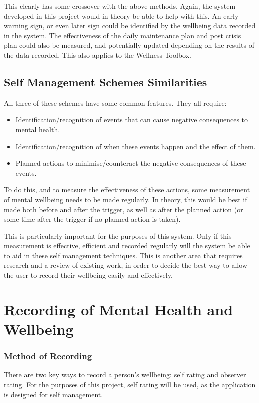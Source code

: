 \documentclass[11pt,openright,a4paper]{report}
\begin{document}
This clearly has some crossover with the above methods. Again, the system developed in this project would in theory be able to help with this. An early warning sign, or even later sign could be identified by the wellbeing data recorded in the system. The effectiveness of the daily maintenance plan and post crisis plan could also be measured, and potentially updated depending on the results of the data recorded. This also applies to the Wellness Toolbox.

\subsection{Self Management Schemes Similarities}
All three of these schemes have some common features. They all require:
\begin{itemize}
\item Identification/recognition of events that can cause negative consequences to mental health.
\item Identification/recognition of when these events happen and the effect of them.
\item Planned actions to minimise/counteract the negative consequences of these events.
\end{itemize}

To do this, and to measure the effectiveness of these actions, some measurement of mental wellbeing needs to be made regularly. In theory, this would be best if made both before and after the trigger, as well as after the planned action (or some time after the trigger if no planned action is taken).

This is particularly important for the purposes of this system. Only if this measurement is effective, efficient and recorded regularly will the system be able to aid in these self management techniques. This is another area that requires research and a review of existing work, in order to decide the best way to allow the user to record their wellbeing easily and effectively.

\section{Recording of Mental Health and Wellbeing} \label{recordingmentalhealth}
\subsubsection{Method of Recording} \label{methodofrecording}
There are two key ways to record a person's wellbeing: self rating and observer rating. For the purposes of this project, self rating will be used, as the application is designed for self management.
\end{document}
